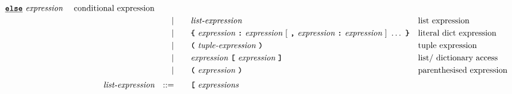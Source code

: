 \begin{alignat*}{9}
                                            \textbf{\texttt{\underline{else}}} \ \textit{expression} \ 
                                                           && \textrm{conditional expression}\\
&&                       && |   &\quad &&   \textit{list-expression} && \textrm{list expression} \\
&&                       && |   &\quad &&   \textbf{\texttt{\{}} \ \textit{expression} \ \textbf{\texttt{:}} \ 
                                            \textit{expression} \  [\ \textbf{\texttt{,}} \ 
                                            \textit{expression} \ \textbf{\texttt{:}} \ 
                                            \textit{expression} \ ]\ \ldots \ \textbf{\texttt{\}}}
                                            && \textrm{literal dict expression}\\
&&                       && |   &\quad &&   \textbf{\texttt{(}}\  \textit{tuple-expression} \ \textbf{\texttt{)}}
                                                           && \textrm{tuple expression}\\
&&                       && |   &\quad &&   \textit{expression} \ 
                                            \textbf{\texttt{[}}\ \textit{expression}\
                                            \textbf{\texttt{]}} && \textrm{list/ dictionary access}\\
&&                       && |   &\quad &&  \textbf{\texttt{(}}\  \textit{expression} \ 
                                            \textbf{\texttt{)}} && \textrm{parenthesised expression}\\[1mm]
&& \textit{list-expression}   && ::= &\quad &&   \textbf{\texttt{[}}\ \textit{expressions}\

\end{alignat*}

